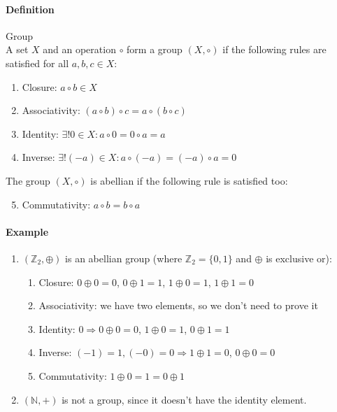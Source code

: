 \documentclass{article}
\newcommand{\N}{\mathbb{N}}
\newcommand{\Z}{\mathbb{Z}}
\newcommand{\Def}{\paragraph{Definition}}
\newcommand{\Example}{\paragraph{Example}}
\begin{document}
	\Def Group
\\A set $X$ and an operation $\circ$ form a group $(X, \circ)$ if the following
	rules are satisfied for all $a, b, c \in X$:
	\begin{enumerate}[label=(\roman*)]
		\item Closure: $a \circ b \in X$

		\item Associativity: $(a \circ b) \circ c = a \circ (b \circ c)$

		\item Identity: $\exists! 0 \in X : a \circ 0 = 0 \circ a = a$

		\item Inverse: $\exists! (-a) \in X : a \circ (-a) = (-a) \circ a = 0$
	\end{enumerate}
	The group $(X, \circ)$ is abellian if the following rule is satisfied too:
	\begin{enumerate}[label=(\roman*)]
		\setcounter{enumi}{4}
		\item Commutativity: $a \circ b = b \circ a$
	\end{enumerate}

	\Example
	\begin{enumerate}[label=(\arabic*)]
		\item $(\Z_2, \oplus)$ is an abellian group (where $\Z_2 = \{ 0, 1 \}$ and
		$\oplus$ is exclusive or):
		\begin{enumerate}[label=(\roman*)]
			\item Closure: $0 \oplus 0 = 0$, $0 \oplus 1 = 1$, $1 \oplus 0 = 1$,
			$1 \oplus 1 = 0$
			\item Associativity: we have two elements, so we don't need to prove it
			\item Identity: $0 \Rightarrow 0 \oplus 0 = 0$, $1 \oplus 0 = 1$,
			$0 \oplus 1 = 1$
			\item Inverse: $(-1) = 1, (-0) = 0 \Rightarrow 1 \oplus 1 = 0$,
			$0 \oplus 0 = 0$
			\item Commutativity: $1 \oplus 0 = 1 = 0 \oplus 1$
		\end{enumerate}

		\item $(\N, +)$ is not a group, since it doesn't have the identity element.
	\end{enumerate}
\end{document}
